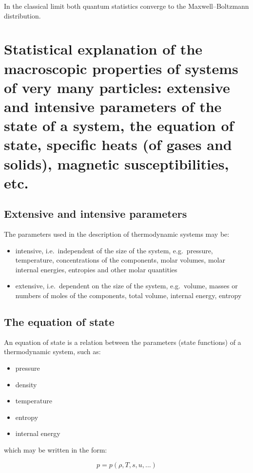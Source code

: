 In the classical limit both quantum statistics converge to the Maxwell--Boltzmann distribution.

\section{Statistical explanation of the macroscopic properties of systems of very many particles: extensive and intensive parameters of the state of a system, the equation of state, specific heats (of gases and solids), magnetic susceptibilities, etc.}

\subsection{Extensive and intensive parameters}

The parameters used in the description of thermodynamic systems may be:

\begin{itemize}
    \item intensive, i.e.\ independent of the size of the system, e.g.\ pressure, temperature, concentrations of the components, molar volumes, molar internal energies, entropies and other molar quantities
    \item extensive, i.e.\ dependent on the size of the system, e.g.\ volume, masses or numbers of moles of the components, total volume, internal energy, entropy
\end{itemize}

\subsection{The equation of state}

An equation of state is a relation between the parameters (state functions) of a thermodynamic system, such as:

\begin{itemize}
    \item pressure
    \item density
    \item temperature
    \item entropy
    \item internal energy
\end{itemize}

which may be written in the form:

\begin{equation}
    p = p\left(\rho,T,s,u,...\right)
\end{equation}

